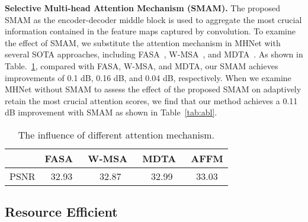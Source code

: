 \documentclass[lettersize,journal]{IEEEtran}
\begin{document}
\textbf{Selective Multi-head Attention Mechanism (SMAM).} The proposed SMAM as the encoder-decoder middle block  is used to  aggregate the  most crucial information contained in the feature maps captured by convolution. To examine the effect of SMAM, we substitute the  attention mechanism in MHNet with several SOTA approaches, including FASA~\cite{kong2023efficient}, W-MSA~\cite{Wang_2022_CVPR}, and MDTA~\cite{Zamir2021Restormer}. As shown in Table.~\ref{tb:amabl}, compared with FASA, W-MSA, and MDTA, our SMAM achieves improvements of 0.1 dB, 0.16 dB, and 0.04 dB, respectively. When we examine MHNet without SMAM to assess the effect of the proposed SMAM on adaptively retain the most crucial attention scores, we find that our method achieves a 0.11 dB improvement with SMAM as shown in Table~\ref{tab:abl}.
\begin{table}
\caption{The influence of different  attention mechanism.}
\label{tb:amabl}
    \centering
    \begin{tabular}{ccccc}
         \hline
           & FASA~\cite{kong2023efficient}  & W-MSA~\cite{Wang_2022_CVPR}  & MDTA~\cite{Zamir2021Restormer}& AFFM
        \\
        \hline
        PSNR  &32.93 &32.87 &32.99  & 33.03
         \\
         \hline
    \end{tabular}
\end{table}










\subsection{Resource Efficient}
\end{document}

